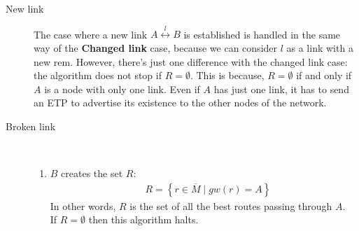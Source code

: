 \documentclass[a4paper]{article}
\newcommand{\pgra}[1]{\left\{#1\right\}}
\newcommand{\eal}[1]{{\begin{align*} #1 \end{align*}}}
\newcommand{\qq}{\qquad}
\def\0{{\emptyset}}
\begin{document}
\begin{description}
	\item[New link]
	The case where a new link $A \stackrel{l}{\leftrightarrow} B$
	is established is handled  in the same way of the
	\textbf{Changed link} case, because we can consider $l$ as a link with
	a new rem. However, there's just one difference with the changed link
	case: the algorithm does not stop if $R=\0$. This is because, $R=\0$
	if and only if $A$
	is a node with only one link. Even if $A$ has just one link, it 
	has to send an ETP to advertise its existence to the other nodes of the network.

	\item[Broken link] \qq\\
		\begin{enumerate}
		\item \label{stepR} $B$ creates the set $R$:
			\eal{
			&R=\pgra{r\in \overline{M}\;|\; gw(r)=A}}
			In other words, 
			$R$ is the set of all the best routes passing through
			$A$. \\
			If $R=\0$ then this algorithm halts.
			

\end{enumerate}
\end{description}
\end{document}
